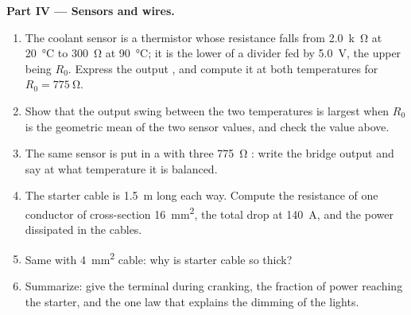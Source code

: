 \begin{problem}
\medskip
\noindent\textbf{Part IV --- Sensors and wires.}
\begin{enumerate}[resume]
  \item The coolant sensor is a thermistor whose resistance falls from
        \qty{2.0}{k\ohm} at \qty{20}{\degreeCelsius} to \qty{300}{\ohm} at
        \qty{90}{\degreeCelsius}; it is the lower  of a divider
        fed by \qty{5.0}{V}, the upper  being $R_0$. Express the
        output , and compute it at both temperatures for
        $R_0 = \qty{775}{\ohm}$.
  \item Show that the output swing between the two temperatures is
        largest when $R_0$ is the geometric mean of the two sensor
        values, and check the value above.
  \item The same sensor is put in a  with three
        \qty{775}{\ohm} : write the bridge output and say at
        what temperature it is balanced.
  \item The starter cable is \qty{1.5}{m} long each way. Compute the
        resistance of one conductor of cross-section \qty{16}{mm^2}, the
        total  drop at \qty{140}{A}, and the power dissipated in
        the cables.
  \item Same with \qty{4}{mm^2} cable: why is starter cable so thick?
  \item Summarize: give the terminal  during cranking, the
        fraction of power reaching the starter, and the one law that
        explains the dimming of the lights.
\end{enumerate}
\end{problem}
